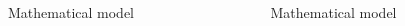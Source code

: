 \documentclass[12pt]{beamer}
\begin{document}
\begin{frame}[t]
\begin{columns}[t]
		\begin{column}{0.32\linewidth}
			
			\begin{block}{{\Large Mathematical model}}
			
			\end{block}
		\end{column}
		
		\begin{column}{0.32\linewidth}
			
			\begin{block}{{\Large Mathematical model}}
			
			\end{block}
		\end{column}
	\end{columns}	
	
	
	\end{frame}
\end{document}
